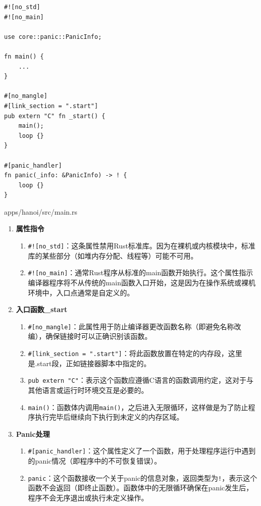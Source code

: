 \begin{listing}[htbp]
    \begin{verbatim}
#![no_std]
#![no_main]

use core::panic::PanicInfo;

fn main() {
    ...
}

#[no_mangle]
#[link_section = ".start"]
pub extern "C" fn _start() {
    main();
    loop {}
}

#[panic_handler]
fn panic(_info: &PanicInfo) -> ! {
    loop {}
}
    \end{verbatim}
    \caption{apps/hanoi/src/main.rs}\label{lst:ApplicationEntry}
\end{listing}

\begin{enumerate}
    \item \textbf{属性指令}
          \begin{enumerate}
              \item \texttt{\#![no\_std]}：这条属性禁用Rust标准库。因为在裸机或内核模块中，标准库的某些部分（如堆内存分配、线程等）可能不可用。
              \item \texttt{\#![no\_main]}：通常Rust程序从标准的main函数开始执行。这个属性指示编译器程序将不从传统的main函数入口开始，这是因为在操作系统或裸机环境中，入口点通常是自定义的。
          \end{enumerate}
    \item \textbf{入口函数\_start}
          \begin{enumerate}
              \item \texttt{\#[no\_mangle]}：此属性用于防止编译器更改函数名称（即避免名称改编），确保链接时可以正确识别该函数。
              \item \texttt{\#[link\_section = ".start"]}：将此函数放置在特定的内存段，这里是.start段，正如链接器脚本中指定的。
              \item \texttt{pub extern "C"}：表示这个函数应遵循C语言的函数调用约定，这对于与其他语言或运行时环境交互是必要的。
              \item \texttt{main()}：函数体内调用\texttt{main()}，之后进入无限循环，这样做是为了防止程序执行完毕后继续向下执行到未定义的内存区域。
          \end{enumerate}
    \item \textbf{Panic处理}
          \begin{enumerate}
              \item \texttt{\#[panic\_handler]}：这个属性定义了一个函数，用于处理程序运行中遇到的panic情况（即程序中的不可恢复错误）。
              \item \texttt{panic}：这个函数接收一个关于panic的信息对象，返回类型为\texttt{!}，表示这个函数不会返回（即终止函数）。函数体中的无限循环确保在panic发生后，程序不会无序退出或执行未定义操作。
          \end{enumerate}
\end{enumerate}

